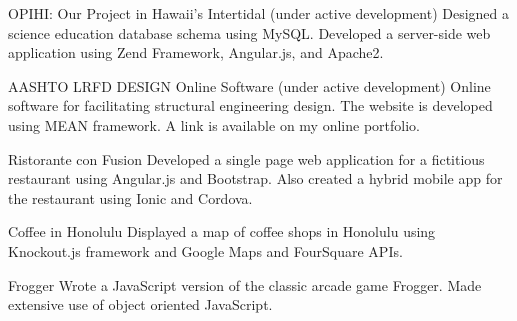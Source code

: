 \begin{cventries}

	\cventry
	{OPIHI: Our Project in Hawaii's Intertidal (under active development)}
	{}
	{}
	{}
	{Designed a science education database schema using MySQL. Developed a server-side web application using Zend Framework, Angular.js, and Apache2.}
	
	\cventry
	{AASHTO LRFD DESIGN Online Software (under active development)	}
	{}
	{}
	{}
	{Online software for facilitating structural engineering design. The website is developed using MEAN framework. A link is available on my online portfolio. }

	\cventry
	{Ristorante con Fusion
	}
	{}
	{}
	{}
	{Developed a single page web application for a fictitious restaurant using Angular.js and Bootstrap.  Also created a hybrid mobile app for the restaurant using Ionic and Cordova.}

	\cventry
	{Coffee in Honolulu
	}
	{}
	{}
	{}
	{Displayed a map of coffee shops in Honolulu using Knockout.js framework and Google Maps and FourSquare APIs.}

	\cventry
	{Frogger
	}
	{}
	{}
	{}
	{Wrote a JavaScript version of the classic arcade game Frogger. Made extensive use of object oriented JavaScript.}



\end{cventries}
